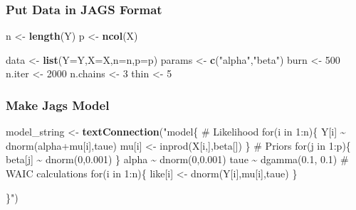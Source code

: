 \documentclass[
]{article}
\newenvironment{Shaded}{\begin{snugshade}}{\end{snugshade}}
\newcommand{\AttributeTok}[1]{\textcolor[rgb]{0.13,0.29,0.53}{#1}}
\newcommand{\DecValTok}[1]{\textcolor[rgb]{0.00,0.00,0.81}{#1}}
\newcommand{\FunctionTok}[1]{\textcolor[rgb]{0.13,0.29,0.53}{\textbf{#1}}}
\newcommand{\NormalTok}[1]{#1}
\newcommand{\OtherTok}[1]{\textcolor[rgb]{0.56,0.35,0.01}{#1}}
\newcommand{\StringTok}[1]{\textcolor[rgb]{0.31,0.60,0.02}{#1}}
\begin{document}
\subsubsection{Put Data in JAGS Format}\label{put-data-in-jags-format-2}

\begin{Shaded}
\begin{Highlighting}[]
\NormalTok{n }\OtherTok{\textless{}{-}} \FunctionTok{length}\NormalTok{(Y)}
\NormalTok{p }\OtherTok{\textless{}{-}} \FunctionTok{ncol}\NormalTok{(X)}

\NormalTok{data }\OtherTok{\textless{}{-}} \FunctionTok{list}\NormalTok{(}\AttributeTok{Y=}\NormalTok{Y,}\AttributeTok{X=}\NormalTok{X,}\AttributeTok{n=}\NormalTok{n,}\AttributeTok{p=}\NormalTok{p)}
\NormalTok{params }\OtherTok{\textless{}{-}} \FunctionTok{c}\NormalTok{(}\StringTok{"alpha"}\NormalTok{,}\StringTok{"beta"}\NormalTok{)}
\NormalTok{burn }\OtherTok{\textless{}{-}} \DecValTok{500}
\NormalTok{n.iter }\OtherTok{\textless{}{-}} \DecValTok{2000}
\NormalTok{n.chains }\OtherTok{\textless{}{-}} \DecValTok{3}
\NormalTok{thin }\OtherTok{\textless{}{-}} \DecValTok{5}
\end{Highlighting}
\end{Shaded}

\subsubsection{Make Jags Model}\label{make-jags-model-2}

\begin{Shaded}
\begin{Highlighting}[]
\NormalTok{model\_string }\OtherTok{\textless{}{-}} \FunctionTok{textConnection}\NormalTok{(}\StringTok{"model\{}
\StringTok{  \# Likelihood}
\StringTok{  for(i in 1:n)\{}
\StringTok{    Y[i] \textasciitilde{} dnorm(alpha+mu[i],taue)}
\StringTok{    mu[i] \textless{}{-} inprod(X[i,],beta[])}
\StringTok{  \}}
\StringTok{  }
\StringTok{  \# Priors}
\StringTok{  for(j in 1:p)\{}
\StringTok{    beta[j] \textasciitilde{} dnorm(0,0.001)}
\StringTok{  \}}
\StringTok{  }
\StringTok{  alpha \textasciitilde{} dnorm(0,0.001)}
\StringTok{  taue \textasciitilde{} dgamma(0.1, 0.1)}
\StringTok{  }
\StringTok{  \# WAIC calculations}
\StringTok{  for(i in 1:n)\{}
\StringTok{    like[i] \textless{}{-} dnorm(Y[i],mu[i],taue)}
\StringTok{  \}}

\StringTok{\}"}\NormalTok{)}
\end{Highlighting}
\end{Shaded}
\end{document}
